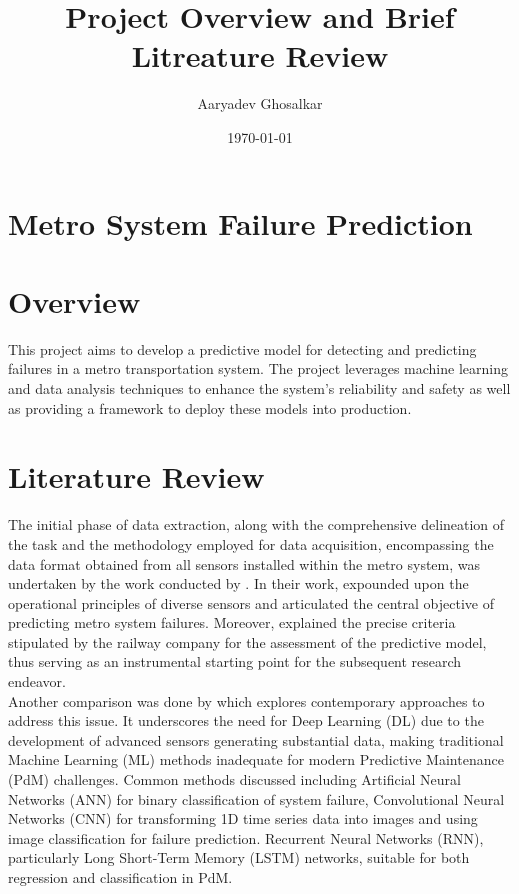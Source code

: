 \documentclass{article}
\title{Project Overview and Brief Litreature Review}
\author{Aaryadev Ghosalkar}
\date{\today}
\begin{document}
\maketitle

\section{Metro System Failure Prediction}

\section*{Overview}

This project aims to develop a predictive model for detecting and predicting failures in a metro transportation system. The project leverages machine learning and data analysis techniques to enhance the system's reliability and safety as well as providing a framework to deploy these models into production.

\section*{Literature Review}

The initial phase of data extraction, along with the comprehensive delineation
of the task and the methodology employed for data acquisition, encompassing the
data format obtained from all sensors installed within the metro system, was
undertaken by the work conducted by \cite{Veloso2022}. In their work,
\cite{Veloso2022} expounded upon the operational principles of diverse sensors
and articulated the central objective of predicting metro system failures. 
Moreover, \cite{Veloso2022} explained the precise criteria stipulated by the railway company for the assessment of the predictive model, thus serving as an instrumental starting point for the subsequent research endeavor. \\

Another comparison was done by \cite{Davari2021} which explores contemporary approaches to address this issue. It underscores the need for Deep Learning (DL) due to the development of advanced sensors generating substantial data, making traditional Machine Learning (ML) methods inadequate for modern Predictive Maintenance (PdM) challenges. Common methods discussed including Artificial Neural Networks (ANN) for binary classification of system failure, Convolutional Neural Networks (CNN) for transforming 1D time series data into images and using image classification for failure prediction. Recurrent Neural Networks (RNN), particularly Long Short-Term Memory (LSTM) networks, suitable for both regression and classification in PdM. \\
\end{document}
